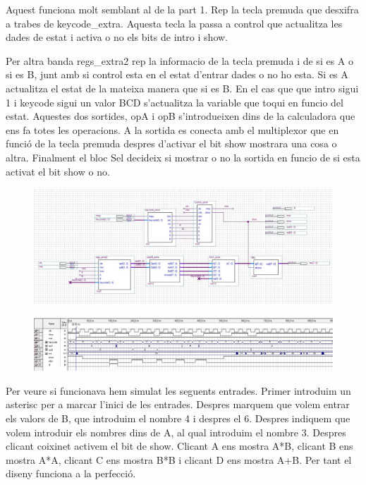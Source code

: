 \documentclass[12pt, a4papre]{article}
\begin{document}
	Aquest funciona molt semblant al de la part 1. Rep la tecla premuda que desxifra a trabes de keycode\_extra. Aquesta tecla la passa a control que actualitza les dades de estat i activa o no els bits de intro i show. 
	
	Per altra banda regs\_extra2 rep la informacio de la tecla premuda i de si es A o si es B, junt amb si control esta en el estat d'entrar dades o no ho esta. Si es A actualitza el estat de la mateixa manera que si es B. En el cas que que intro sigui 1 i keycode sigui un valor BCD s'actualitza la variable que toqui en funcio del estat. Aquestes dos sortides, opA i opB s'introdueixen dins de la calculadora que ens fa totes les operacions. A la sortida es conecta amb el multiplexor que en funció de la tecla premuda despres d'activar el bit show mostrara una cosa o altra. Finalment el bloc Sel decideix si mostrar o no la sortida en funcio de si esta activat el bit show o no.
	
	\begin{figure}[H]
		\begin{center}
		\includegraphics[width=130mm]{ppalExtra.jpeg}
		\end{center}
	\end{figure}
	
	\begin{figure}[H]
		\begin{center}
		\includegraphics[width=130mm]{SimPpalExtra.jpeg}
		\end{center}
	\end{figure}
	
	Per veure si funcionava hem simulat les seguents entrades. Primer introduim un asterisc per a marcar l'inici de les entrades. Despres marquem que volem entrar els valors de B, que introduim el nombre 4 i despres el 6. Despres indiquem que volem introduir els nombres dins de A, al qual introduim el nombre 3. Despres clicant coixinet activem el bit de show. Clicant A ens mostra A*B, clicant B ens mostra A*A, clicant C ens mostra B*B i clicant D ens mostra A+B. Per tant el diseny funciona a la perfecció.
	
	


	
\end{document}
